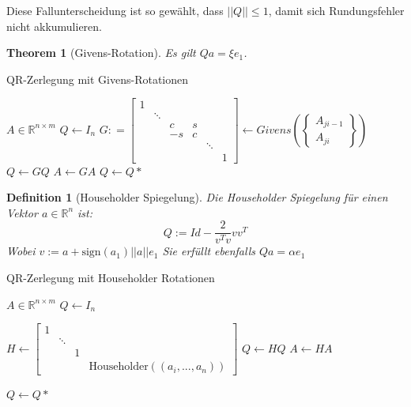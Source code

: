 \documentclass[10pt,a4paper]{article}
\newtheorem{theorem}{Theorem}
\newtheorem{definition}{Definition}
\begin{document}
	Diese Fallunterscheidung ist so gewählt, dass $||Q||\leq 1$, damit sich Rundungsfehler nicht akkumulieren.
	\begin{theorem}[Givens-Rotation]
		Es gilt $Qa = \xi e_1$.
	\end{theorem}
	\begin{algorithm}[H]
		\caption{QR-Zerlegung mit Givens-Rotationen}
		\begin{algorithmic}
			\Require $A \in \mathbb{R}^{n\times m}$
			\State $Q \leftarrow I_n$
					\State $G : = \begin{bmatrix}
					1 &  &  &  &  &  \\
					& \ddots &  &  &  &  \\
					&  & c & s &  &  \\
					&  & -s & c &  &  \\
					&  &  &  & \ddots &  \\
					&  &  &  &  & 1
				\end{bmatrix} \leftarrow Givens(\begin{Bmatrix}
						A_{ji-1} \\
						A_{ji}
					\end{Bmatrix})$
					\State $Q \leftarrow GQ$
					\State $A \leftarrow GA$
				\EndFor
			\EndFor
			\State $Q \leftarrow Q*$
		\end{algorithmic}
	\end{algorithm}
	\begin{definition}[Householder Spiegelung]
		Die Householder Spiegelung für einen Vektor $a \in \mathbb{R}^n$ ist:
		$$Q := Id -\frac{2}{v^Tv}vv^T$$
		Wobei $v :=a+\text{sign}(a_1)||a||e_1$
		Sie erfüllt ebenfalls $Qa = \alpha e_1$
	\end{definition}
	\begin{algorithm}
		\caption{QR-Zerlegung mit Householder Rotationen}
		\begin{algorithmic}
			\Require \Require $A \in \mathbb{R}^{n\times m}$
			\State $Q \leftarrow I_n$
			\For{$i \in [n]$}
			
			\State $H \leftarrow \begin{bmatrix}
				1 & & &    \\
				& \ddots & & \\
				& & 1 & \\
				& & & \text{Householder}((a_i, ..., a_n))
			\end{bmatrix}$
			\State $Q \leftarrow HQ$
			\State $A \leftarrow HA$
			
			\EndFor
			\State $Q \leftarrow Q*$
		\end{algorithmic}
	\end{algorithm}
\end{document}
